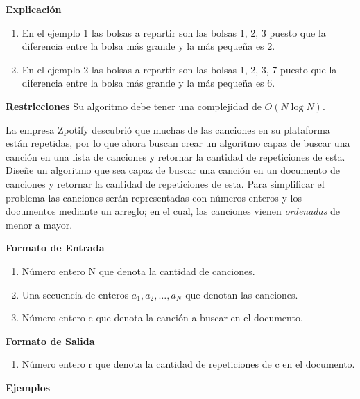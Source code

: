 \documentclass[12pt]{exam}
\newcommand{\problemStatement}[1]{
    \centering{\underline{#1}}
    \vspace{0.5cm}
}
\begin{document}
\begin{flushleft}
\vspace{0.25cm}
\textbf{Explicación}
\begin{enumerate}
    \item En el ejemplo 1 las bolsas a repartir son las bolsas 1, 2, 3 puesto que la diferencia entre la bolsa más grande y la más pequeña es 2.
    \item En el ejemplo 2 las bolsas a repartir son las bolsas 1, 2, 3, 7 puesto que la diferencia entre la bolsa más grande y la más pequeña es 6.
\end{enumerate}
\textbf{Restricciones}
\newline 
Su algoritmo debe tener una complejidad de $O(N \log N)$.
\end{flushleft}

\newpage 

\problemStatement{Canciones Repetidas}

\begin{flushleft}
La empresa Zpotify descubrió que muchas de las canciones en su plataforma están repetidas, por lo que ahora buscan crear un algoritmo 
capaz de buscar una canción en una lista de canciones y retornar la cantidad de repeticiones de esta. 
\newline
Diseñe un algoritmo que sea capaz de buscar una canción en un documento de canciones y retornar la cantidad de repeticiones de esta. 
Para simplificar el problema las canciones serán representadas con números enteros y los documentos mediante un arreglo; en el cual, 
las canciones vienen \textit{ordenadas} de menor a mayor.

\textbf{Formato de Entrada}
\begin{enumerate}
\item Número entero N que denota la cantidad de canciones.
\item Una secuencia de enteros $a_1, a_2, \dots, a_N$ que denotan las canciones.
\item Número entero c que denota la canción a buscar en el documento.
\end{enumerate}


\textbf{Formato de Salida}
\begin{enumerate}
    \item Número entero r que denota la cantidad de repeticiones de c en el documento.
\end{enumerate}

\textbf{Ejemplos}
\end{flushleft}
\end{document}
